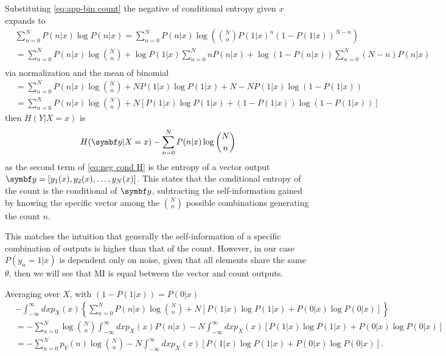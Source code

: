 Substituting \ref{eq:app-bin count} the negative of conditional entropy given $x$ expands to
\begin{align}
    &\sum_{n=0}^N P(n\vert x)\log P(n\vert x)=\sum_{n=0}^N P(n\vert x)\log\left( \binom{N}{n} P(1\vert x)^n(1 - P(1\vert x))^{N-n}\right)\\ 
    &=\sum_{n=0}^N P(n\vert x) \log \binom{N}{n} + \log P(1|x)\sum_{n=0}^N n P(n\vert x) + \log (1-P(n|x)) \sum_{n=0}^N (N-n) P(n|x)\\
\end{align}
via normalization and the mean of binomial
\begin{align}
    \label{eq:neg cond H}
    &=\sum_{n=0}^N P(n\vert x) \log \binom{N}{n} + N P(1|x)\log P(1|x) + N - NP(1|x)\log(1-P(1|x))\\
    &=\sum_{n=0}^N P(n\vert x) \log \binom{N}{n} + N \left[P(1|x)\log P(1|x) + (1-P(1|x))\log (1-P(1|x))\right]
\end{align}
then $H(Y|X=x)$ is
\begin{equation}
    H(\vb{y}|X=x) - \sum_{n=0}^N P(n\vert x) \log \binom{N}{n}
\end{equation}
as the second term of \ref{eq:neg cond H} is the entropy of a vector output $\vb{y}=\left[y_1(x), y_2(x), \dots, y_N(x)\right]$. 
This states that the conditional entropy of the count is the conditional of $\vb{y}$, subtracting the self-information gained by knowing the specific vector among the $\binom{N}{n}$ possible combinations generating the count $n$.

This matches the intuition that generally the self-information of a specific combination of outputs is higher than that of the count. 
However, in our case $P(y_n=1|x)$ is dependent only on noise, given that all elements share the same $\theta$, then we will see that MI is equal between the vector and count outputs.

Averaging over $X$, with $(1-P(1|x)) = P(0|x)$
\begin{align*}
    &-\int_{-\infty}^\infty dx p_X(x) \left\{\sum_{n=0}^N P(n\vert x) \log \binom{N}{n} + N \left[P(1|x)\log P(1|x) + P(0|x)\log P(0|x)\right]\right\}\\
    &=-\sum_{n=0}^N \log \binom{N}{n}\int_{-\infty}^\infty dx p_X(x) P(n|x) - N\int_{-\infty}^{\infty} dx p_X(x)\left[P(1|x)\log P(1|x) + P(0|x)\log P(0|x)\right]\\
    &=-\sum_{n=0}^N p_Y(n) \log \binom{N}{n} - N\int_{-\infty}^{\infty} dx p_X(x)\left[P(1|x)\log P(1|x) + P(0|x)\log P(0|x)\right] \text{.}
\end{align*}

